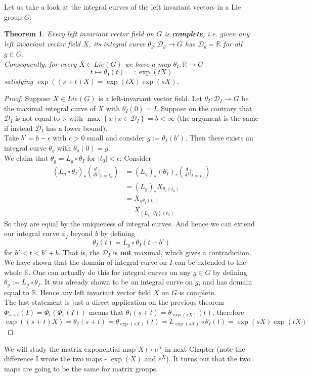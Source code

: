 \documentclass[11pt]{book}
\newtheorem{theorem}{Theorem}[section]
\newcommand{\bb}[1]{\mathbb{#1}}
\newcommand{\mc}[1]{\mathcal{#1}}
\begin{document}
Let us take a look at the integral curves of the left invariant vectors in a Lie group $G$:
\begin{theorem}
Every left invariant vector field on $G$ is \textbf{complete}, i.e. given any left invariant vector field $X$, its integral curve $\theta_g: \mc{D}_g \to G$ has $\mc{D}_g = \bb{R}$ for all $g \in G$. \\
Consequently, for every $X \in Lie(G)$ we have a map $\theta_I: \bb{R} \to G$
$$t \mapsto \theta_I(t) =: \exp(tX)$$
satisfying $\exp((s+t)X) = \exp(tX)\exp(sX)$.
\end{theorem}
\begin{proof}
Suppose $X \in Lie(G)$ is a left-invariant vector field. Let $\theta_I: \mc{D}_I \to G$ be the maximal integral curve of $X$ with $\theta_I(0) = I$. Suppose on the contrary that $\mc{D}_I$ is not equal to $\bb{R}$ with $\max\left\{x\ \Big|\ x \in \mc{D}_I\right\} = b < \infty$ (the argument is the same if instead $\mc{D}_I$ has a lower bound).\\

Take $b' = b- \epsilon$ with $\epsilon > 0$ small and consider $g := \theta_I(b')$. Then there exists an integral curve $\theta_g$ with $\theta_g(0) = g$.\\
We claim that $\theta_g = L_g \circ \theta_I$ for $|t_0| < \epsilon$: Consider
\begin{align*}
(L_g \circ \theta_I)_*(\frac{d}{dt}  \Big|_{t=t_0}) &= (L_g)_* (\theta_I)_*(\frac{d}{dt}  \Big|_{t=t_0})\\
&= (L_g)_*X_{\theta_I(t_0)}\\
&= X_{g\theta_I(t_0)} \\
&= X_{(L_g \circ \theta_I)(t_0)}
\end{align*}
So they are equal by the uniqueness of integral curves. And hence we can extend our integral curve $\phi_I$ beyond $b$ by defining
$$\theta_I(t) = L_g \circ \theta_I(t - b')$$
for $b' < t < b'+b$. That is, the $\mc{D}_I$ is \textbf{not} maximal, which gives a contradiction.\\
We have shown that the domain of integral curve on $I$ can be extended to the whole $\bb{R}$. One can actually do this for integral curves on any $g \in G$ by defining $\theta_g := L_g \circ \theta_I$. It was already shown to be an integral curve on $g$, and has domain equal to $\bb{R}$. Hence any left invariant vector field $X$ on $G$ is complete.\\
The last statement is just a direct application on the previous theorem - $\Phi_{s+t}(I) = \Phi_t (\Phi_s(I))$ means that $\theta_I(s+t) = \theta_{\exp(sX)}(t)$, therefore
$$\exp((s+t)X)= \theta_I(s+t) = \theta_{\exp(sX)}(t) = L_{\exp(sX)} \circ \theta_I(t) = \exp(sX)\exp(tX)$$
\end{proof}
We will study the matrix exponential map $X \mapsto e^X$ in next Chapter (note the difference I wrote the two maps - $\exp(X)$ and $e^X$). It turns out that the two maps are going to be the same for matrix groups.\\
\end{document}
